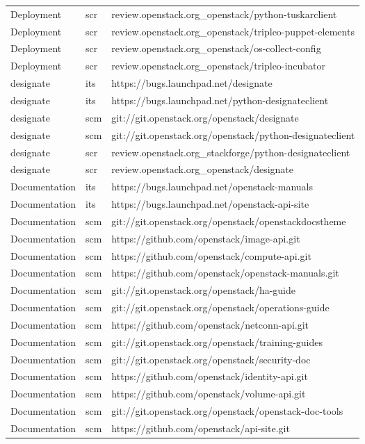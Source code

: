 \begin{center}
\begin{longtable}{|p{4cm}|p{1cm}|p{10cm}|}
Deployment&scr&review.openstack.org\_openstack/python-tuskarclient\\ 
Deployment&scr&review.openstack.org\_openstack/tripleo-puppet-elements\\ 
Deployment&scr&review.openstack.org\_openstack/os-collect-config\\ 
Deployment&scr&review.openstack.org\_openstack/tripleo-incubator\\ 
designate&its&https://bugs.launchpad.net/designate\\ 
designate&its&https://bugs.launchpad.net/python-designateclient\\ 
designate&scm&git://git.openstack.org/openstack/designate\\ 
designate&scm&git://git.openstack.org/openstack/python-designateclient\\ 
designate&scr&review.openstack.org\_stackforge/python-designateclient\\ 
designate&scr&review.openstack.org\_openstack/designate\\ 
Documentation&its&https://bugs.launchpad.net/openstack-manuals\\ 
Documentation&its&https://bugs.launchpad.net/openstack-api-site\\ 
Documentation&scm&git://git.openstack.org/openstack/openstackdocstheme\\ 
Documentation&scm&https://github.com/openstack/image-api.git\\ 
Documentation&scm&https://github.com/openstack/compute-api.git\\ 
Documentation&scm&https://github.com/openstack/openstack-manuals.git\\ 
Documentation&scm&git://git.openstack.org/openstack/ha-guide\\ 
Documentation&scm&git://git.openstack.org/openstack/operations-guide\\ 
Documentation&scm&https://github.com/openstack/netconn-api.git\\ 
Documentation&scm&git://git.openstack.org/openstack/training-guides\\ 
Documentation&scm&git://git.openstack.org/openstack/security-doc\\ 
Documentation&scm&https://github.com/openstack/identity-api.git\\ 
Documentation&scm&https://github.com/openstack/volume-api.git\\ 
Documentation&scm&git://git.openstack.org/openstack/openstack-doc-tools\\ 
Documentation&scm&https://github.com/openstack/api-site.git\\ 

\end{longtable}
\end{center}
